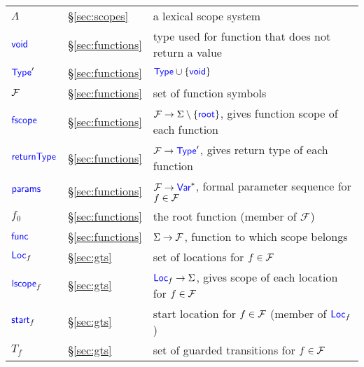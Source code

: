 {\begin{tabular}{lll}
    $\Lambda$ & \S\ref{sec:scopes} & a lexical scope system\\
    $\textup{\textsf{\textcolor{blue}{void}}}$ & \S\ref{sec:functions} & type used for function that does not return  a value\\
    $\textup{\textsf{\textcolor{blue}{Type}}}'$ & \S\ref{sec:functions} & $\textup{\textsf{\textcolor{blue}{Type}}}\cup\{\textup{\textsf{\textcolor{blue}{void}}}\}$\\
    $\mathcal{F}$ & \S\ref{sec:functions} & set of function symbols\\
    $\textup{\textsf{\textcolor{blue}{fscope}}}$ & \S\ref{sec:functions} & $\mathcal{F}\rightarrow\Sigma\setminus\{\textup{\textsf{\textcolor{blue}{root}}}\}$, gives function scope of each function\\
    $\textup{\textsf{\textcolor{blue}{returnType}}}$ & \S\ref{sec:functions} & $\mathcal{F}\rightarrow\textup{\textsf{\textcolor{blue}{Type}}}'$, gives return type of each function\\
    $\textup{\textsf{\textcolor{blue}{params}}}$ & \S\ref{sec:functions} & $\mathcal{F}\rightarrow\textup{\textsf{\textcolor{blue}{Var}}}^*$, formal
    parameter sequence for $f\in\mathcal{F}$\\
    $f_0$ & \S\ref{sec:functions} & the root function (member of
    $\mathcal{F}$)\\
    $\textup{\textsf{\textcolor{blue}{func}}}$ & \S\ref{sec:functions} & $\Sigma\rightarrow\mathcal{F}$, function to
    which scope belongs\\
    $\textup{\textsf{\textcolor{blue}{Loc}}}_f$ & \S\ref{sec:gts} & set of locations for $f\in\mathcal{F}$\\
    $\textup{\textsf{\textcolor{blue}{lscope}}}_f$ & \S\ref{sec:gts} & $\textup{\textsf{\textcolor{blue}{Loc}}}_f\rightarrow\Sigma$, gives scope of each location for $f\in\mathcal{F}$\\
    $\textup{\textsf{\textcolor{blue}{start}}}_f$ & \S\ref{sec:gts} & start location for $f\in\mathcal{F}$ (member of $\textup{\textsf{\textcolor{blue}{Loc}}}_f$)\\
    $T_f$ & \S\ref{sec:gts} & set of guarded transitions for $f\in\mathcal{F}$\\
  \end{tabular}
}



\newcommand{\cckey}{\$}
\newcommand{\cc}[1]{\mbox{\texttt{\cckey{}#1}}}
\newcommand{\cabstract}{\cc{abstract}}
\newcommand{\ccontains}{\cc{contains}}
\newcommand{\ccopy}{\cc{copy}}
\newcommand{\cproc}{\cc{proc}}
\newcommand{\cprocdefined}{\cc{proc{\U}defined}}
\newcommand{\cprocNull}{\cc{proc{\U}null}}
\newcommand{\cself}{\cc{self}}
\newcommand{\cinput}{\cc{input}}
\newcommand{\coutput}{\cc{output}}
\newcommand{\cspawn}{\cc{spawn}}
\newcommand{\cwait}{\cc{wait}}
\newcommand{\cwaitall}{\cc{waitall}}
\newcommand{\cassert}{\cc{assert}}
\newcommand{\ctrue}{\cc{true}}
\newcommand{\cfalse}{\cc{false}}
\newcommand{\cassume}{\cc{assume}}
\newcommand{\catom}{\cc{atom}}
\newcommand{\catomic}{\cc{atomic}}
\newcommand{\cwhen}{\cc{when}}
\newcommand{\cchoose}{\cc{choose}}
\newcommand{\cchooseint}{\cc{choose{\U}int}}
\newcommand{\cinvariant}{\cc{invariant}}
\newcommand{\crequires}{\cc{requires}}
\newcommand{\censures}{\cc{ensures}}
\newcommand{\cexit}{\cc{exit}}
\newcommand{\cresult}{\cc{result}}
\newcommand{\cat}{\texttt{@}}
\newcommand{\ccollective}{\cc{collective}}
\newcommand{\cequals}{\cc{equals}}
\newcommand{\cfor}{\cc{for}}
\newcommand{\cparfor}{\cc{parfor}}

